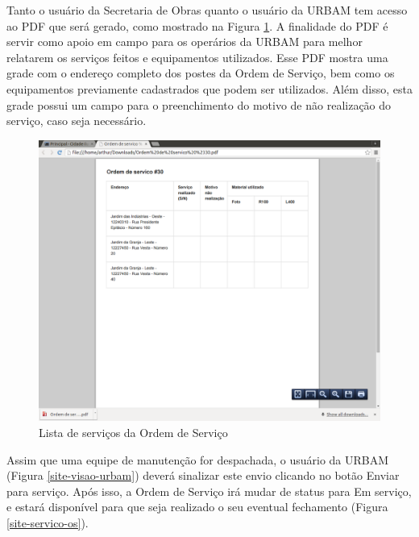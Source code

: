 \documentclass[
	article,			%
	11pt,				%
	oneside,			%
	a4paper,			%
	english,			%
	brazil,				%
	sumario=tradicional
	]{abntex2}
\begin{document}
\clearpage

Tanto o usuário da Secretaria de Obras quanto o usuário da URBAM tem acesso ao PDF que será gerado, como mostrado na Figura \ref{site-pdf}.
A finalidade do PDF é servir como apoio em campo para os operários da URBAM para melhor relatarem os serviços feitos e equipamentos utilizados.
Esse PDF mostra uma grade com o endereço completo dos postes da Ordem de Serviço, bem como os equipamentos previamente cadastrados que podem ser utilizados.
Além disso, esta grade possui um campo para o preenchimento do motivo de não realização do serviço, caso seja necessário.

\begin{figure}[!htbp]
 \centering
 \caption{\label{site-pdf}Lista de serviços da Ordem de Serviço}
 \includegraphics[scale=0.25]{site/12-pdf.png}
\end{figure}

\clearpage

Assim que uma equipe de manutenção for despachada, o usuário da URBAM (Figura \ref{site-visao-urbam}) deverá sinalizar este envio clicando no botão Enviar para serviço.
Após isso, a Ordem de Serviço irá mudar de status para Em serviço, e estará disponível para que seja realizado o seu eventual fechamento (Figura \ref{site-servico-os}).
\end{document}
